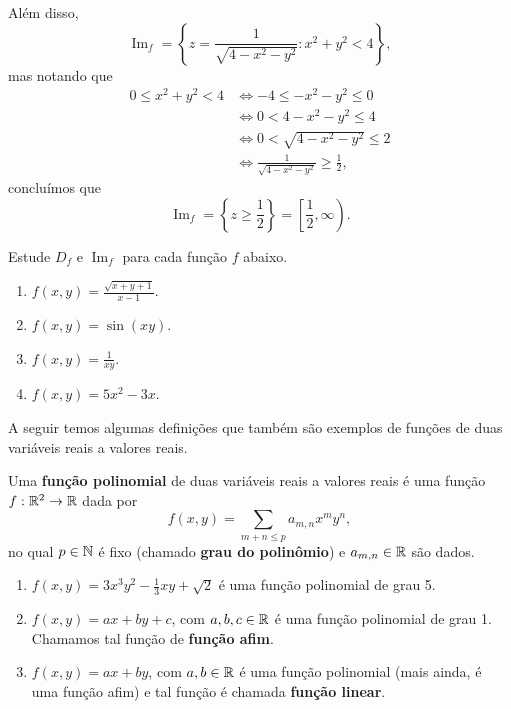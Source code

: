 \begin{example}
    Além disso, \[\operatorname{Im}_f = \left\{ z = \frac{1}{\sqrt{4 - x^2 - y^2}} : x^2 + y^2 < 4 \right\},\] mas notando que
        \begin{align*}
            0 \leq x^2 + y^2 < 4
                & \Leftrightarrow  - 4 \leq -x^2 - y^2 \leq 0 \\
                & \Leftrightarrow 0 < 4 - x^2 - y^2 \leq 4 \\
                & \Leftrightarrow 0 < \sqrt{4 - x^2 - y^2} \leq 2 \\
                & \Leftrightarrow \frac{1}{\sqrt{4 - x^2 - y^2}} \geq \frac{1}{2},
        \end{align*}
    concluímos que \[\operatorname{Im}_f = \left\{z \geq \frac{1}{2}\right\} = \left[\frac{1}{2},\infty\right).\]
\end{example}

\begin{exercise}
    Estude \(D_f\) e \(\operatorname{Im}_f\) para cada função \(f\) abaixo.
        \begin{enumerate}
            \item \(f(x,y) = \frac{\sqrt{x+y+1}}{x-1}\).
            \item \(f(x,y) = \sin(xy)\).
            \item \(f(x,y) = \frac{1}{xy}\).
            \item \(f(x,y) = 5x^2 - 3x\).
        \end{enumerate}
\end{exercise}

A seguir temos algumas definições que também são exemplos de funções de duas variáveis reais a valores reais.

\begin{definition}
    Uma \textbf{função polinomial} de duas variáveis reais a valores reais é uma função \(f:\mathbb{R}^2 \to \mathbb{R}\) dada por \[f(x,y) = \sum_{m+n\leq p} a_{m,n}x^m y^n,\] no qual \(p\in\mathbb{N}\) é fixo (chamado \textbf{grau do polinômio}) e \(a_{m,n}\in\mathbb{R}\) são dados.
\end{definition}

\begin{example}
    \begin{enumerate}
        \item \(f(x,y) = 3x^3 y^2 - \frac{1}{3} x y + \sqrt{2}\) é uma função polinomial de grau 5.
        \item \(f(x,y) = ax + by + c\), com \(a,b,c\in\mathbb{R}\) é uma função polinomial de grau 1. Chamamos tal função de \textbf{função afim}.
        \item \(f(x,y) = ax + by\), com \(a,b\in\mathbb{R}\) é uma função polinomial (mais ainda, é uma função afim) e tal função é chamada \textbf{função linear}.
    \end{enumerate}
\end{example}

